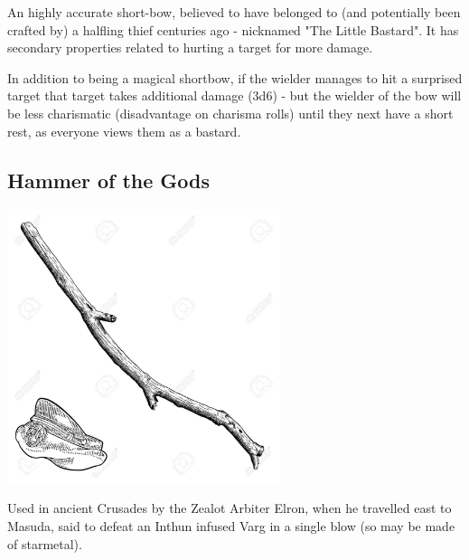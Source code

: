 \noindent 

An highly accurate short-bow, believed to have belonged to (and potentially been crafted by) a halfling thief centuries ago - nicknamed "The Little Bastard". It has secondary properties related to hurting a target for more damage.

In addition to being a magical shortbow, if the wielder manages to hit a surprised target that target takes additional damage (3d6) - but the wielder of the bow will be less charismatic (disadvantage on charisma rolls) until they next have a short rest, as everyone views them as a bastard.

\smallskip

\subsection*{Hammer of the Gods} 

\begin{center}
\includegraphics[width=80mm]{./content/img/xxx.png}
\begin{figure}[h]
\end{figure}
\end{center}

\noindent 

Used in ancient Crusades by the Zealot Arbiter Elron, when he travelled east to Masuda, said to defeat an Inthun infused Varg in a single blow (so may be made of starmetal).

